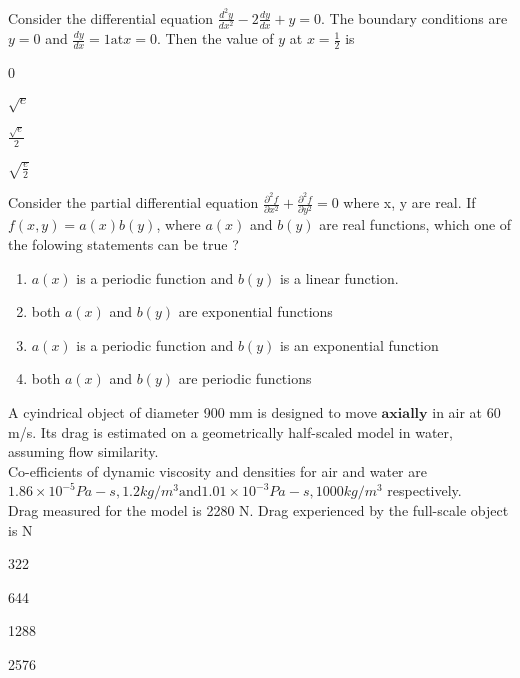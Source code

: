 	\item Consider the differential equation $\frac{d^2 y}{d x^2} - 2 \frac{dy}{dx} + y = 0$. The boundary conditions are $y=0$ and $\frac{dy}{dx} = 1 \text{at} x=0$. Then the value of $y$ at $x = \frac{1}{2}$ is
		\begin{enumerate}
		\end{enumerate}
	\item Consider the partial differential equation $\frac{\partial ^2 f}{\partial x^2} + \frac{\partial ^2 f}{\partial y^2} = 0$ where x, y are real. If $f(x,y) = a(x) b(y) $, where $a(x)$ and $b(y)$ are real functions, which one of the folowing statements can be true ?
		\begin{enumerate}
			\item $a(x)$ is a periodic function and $b(y)$ is a linear function.
			\item both $a(x)$ and $b(y)$ are exponential functions
			\item $a(x)$ is a periodic function and $b(y)$ is an exponential function
			\item both $a(x)$ and $b(y)$ are periodic functions
		\end{enumerate}
	\item A cyindrical object of diameter 900 mm is designed to move $\textbf{axially}$ in air at 60 m/s. Its drag is estimated on a geometrically half-scaled model in water, assuming flow similarity. \\
		Co-efficients of dynamic viscosity and densities for air and water are $1.86 \times 10^{-5} Pa-s, 1.2 kg/m^3 \text{and} 1.01 \times 10^{-3} Pa-s, 1000 kg/m^3$ respectively. \\
		Drag measured for the model is 2280 N. Drag experienced by the full-scale object is \underline{  } N
		\begin{enumerate}
				\begin{multicols}{4}
				\item 322
				\item 644
				\item 1288
				\item 2576
				\end{multicols}
		\end{enumerate}


